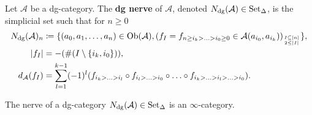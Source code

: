 \begin{defi}
	Let $ \mathcal{ A } $ be a dg-category. 
	The \textbf{dg nerve} of $ \mathcal{ A } $, denoted $ N_{ \operatorname{dg} } ( \mathcal{ A } ) \in \operatorname{Set}_{\Delta} $, is the simplicial set such that for $ n \geq 0 $
	\begin{align*}
		N_{ \operatorname{dg} } ( \mathcal{ A } )_n
		&\coloneqq 
		\{ ( a_0 , a_1 , \dotsc , a_n ) \in \operatorname{Ob} ( \mathcal{ A } ) , ( f_I = f_{ n \geq i_k > \dotsc > i_0 \geq 0 } \in \mathcal{ A } ( a_{ i_0 } , a_{ i_k } ) )_{ I \subseteq [ n ] \atop 2 \leq \lvert I \rvert } \},
		\\
		\lvert f_I \rvert 
		&=
		- ( \# ( I \setminus \{ i_k , i_0 \} ) ),
		\\
		d_{ \mathcal{ A } } ( f_I ) 
		&=
		\sum_{ l = 1 }^{ k - 1 } ( - 1 )^l ( f_{ i_k > \dotsc > i_l } \circ f_{ i_l > \dotsc > i_0 } \circ \dotsc \circ f_{ i_k > \dotsc > i_l > \dotsc > i_0 } ) .
	\end{align*}
\end{defi}

\begin{thm}
	The nerve of a dg-category $ N_{ \operatorname{dg} } ( \mathcal{ A } ) \in \operatorname{Set}_{\Delta} $ is an $ \infty $-category.
\end{thm}


